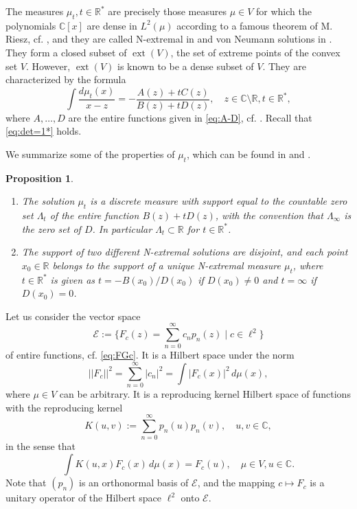 \documentclass [12pt]{article}
\newtheorem{prop}[thm]{Proposition}
\DeclareMathOperator{\ext}{ext}
\newcommand{\C}{\mathbb{C}}
\newcommand{\R}{\mathbb{R}}
\begin{document}
The measures $\mu_t, t\in\R^*$ are precisely those measures $\mu\in V$  for which the polynomials $\C[x]$ are dense in $L^2(\mu)$ according to a famous theorem of M. Riesz, cf. \cite{Ri}, and they are called N-extremal  in \cite{Ak} and von Neumann solutions in \cite{S}.  They form a closed subset of $\ext(V)$, the set of extreme points of the convex set $V$. However, $\ext(V)$ is known to be a dense subset of $V$.  They are characterized by the formula
\begin{equation}\label{eq:Npar}
\int\frac{d\mu_t(x)}{x-z}=-\frac{A(z)+tC(z)}{B(z)+tD(z)},\quad z\in \C\setminus\R, t\in\R^*,
\end{equation}
where $A,\ldots,D$ are the entire functions given in \eqref{eq:A-D}, cf. \cite[Theorem 7.6]{Sch}. Recall that \eqref{eq:det=1*} holds.

We summarize some of the properties of $\mu_t$, which can be found in \cite{Ak} and \cite{Sch}.

\begin{prop}\label{thm:supportNext}
\begin{enumerate}
\item[(i)] The  solution $\mu_t$ is a discrete measure with support equal to the countable zero set $\Lambda_t$ of the entire function $B(z)+tD(z)$, with the convention that $\Lambda_\infty$ is the zero set of $D$. In particular $\Lambda_t\subset\R$ for $t\in\R^*$.
\item[(ii)] The support of two different N-extremal solutions are disjoint, and each point $x_0\in\R$ belongs to the support of a unique N-extremal measure $\mu_t$, where
$t\in\R^*$ is given  as $t=-B(x_0)/D(x_0)$ if $D(x_0)\neq 0$ and $t=\infty$ if $D(x_0)=0$.
\end{enumerate}
\end{prop}


Let us consider the vector space
\begin{equation}\label{eq:E} 
\mathcal E:=\{F_c(z)=\sum_{n=0}^\infty c_np_n(z) \mid c\in\ell^2\}
\end{equation}
of entire functions, cf. \eqref{eq:FGc}.  It is a Hilbert space under the norm
$$
||F_c||^2=\sum_{n=0}^\infty |c_n|^2=\int |F_c(x)|^2\,d\mu(x),
$$
where $\mu\in V$ can be arbitrary. It is a reproducing kernel Hilbert space of functions with the reproducing kernel
$$
K(u,v):=\sum_{n=0}^\infty p_n(u)p_n(v),\quad u,v\in\C,
$$ 
in the sense that
$$
\int K(u,x)F_c(x)\,d\mu(x)=F_c(u),\quad \mu\in V, u\in\C.
$$
Note that $(p_n)$ is an orthonormal basis of $\mathcal E$, and the mapping $c\mapsto F_c$  
is a unitary operator of the Hilbert space $\ell^2$ onto $\mathcal E$.
\end{document}
